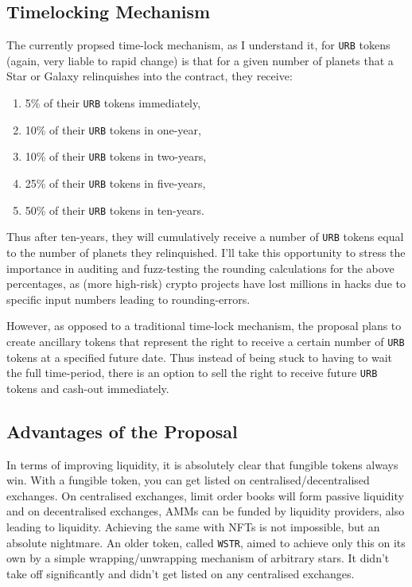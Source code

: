 \documentclass{article}
\begin{document}
	\subsection{Timelocking Mechanism}
	The currently propsed time-lock mechanism, as I understand it, for \texttt{URB} tokens (again, very liable to rapid change) is that for a given number of planets that a Star or Galaxy relinquishes into the contract, they receive:
	\begin{enumerate}
		\item 5\% of their \texttt{URB} tokens immediately,
		\item 10\% of their \texttt{URB} tokens in one-year,
		\item 10\% of their \texttt{URB} tokens in two-years,
		\item 25\% of their \texttt{URB} tokens in five-years,
		\item 50\% of their \texttt{URB} tokens in ten-years.
	\end{enumerate}
	Thus after ten-years, they will cumulatively receive a number of \texttt{URB} tokens equal to the number of planets they relinquished. I'll take this opportunity to stress the importance in auditing and fuzz-testing the rounding calculations for the above percentages, as (more high-risk) crypto projects have lost millions in hacks due to specific input numbers leading to rounding-errors.
	
	However, as opposed to a traditional time-lock mechanism, the proposal plans to create ancillary tokens that represent the right to receive a certain number of \texttt{URB} tokens at a specified future date. Thus instead of being stuck to having to wait the full time-period, there is an option to sell the right to receive future \texttt{URB} tokens and cash-out immediately.
	
	\subsection{Advantages of the Proposal}
	In terms of improving liquidity, it is absolutely clear that fungible tokens always win. With a fungible token, you can get listed on centralised/decentralised exchanges. On centralised exchanges, limit order books will form passive liquidity and on decentralised exchanges, AMMs can be funded by liquidity providers, also leading to liquidity. Achieving the same with NFTs is not impossible, but an absolute nightmare. An older token, called \texttt{WSTR}, aimed to achieve only this on its own by a simple wrapping/unwrapping mechanism of arbitrary stars. It didn't take off significantly and didn't get listed on any centralised exchanges.
	
\end{document}
